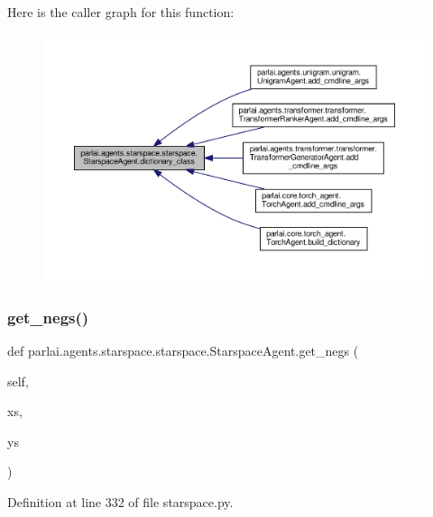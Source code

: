 Here is the caller graph for this function\+:
\nopagebreak
\begin{figure}[H]
\begin{center}
\leavevmode
\includegraphics[width=350pt]{classparlai_1_1agents_1_1starspace_1_1starspace_1_1StarspaceAgent_a04d4db961ea8e3ed0ca1cb4cc7a7eca5_icgraph}
\end{center}
\end{figure}
\mbox{\label{classparlai_1_1agents_1_1starspace_1_1starspace_1_1StarspaceAgent_a9591d5f485debcf4611e24be38900b5e}} 
\subsubsection{\texorpdfstring{get\+\_\+negs()}{get\_negs()}}
{\footnotesize\ttfamily def parlai.\+agents.\+starspace.\+starspace.\+Starspace\+Agent.\+get\+\_\+negs (\begin{DoxyParamCaption}\item[{}]{self,  }\item[{}]{xs,  }\item[{}]{ys }\end{DoxyParamCaption})}



Definition at line 332 of file starspace.\+py.



